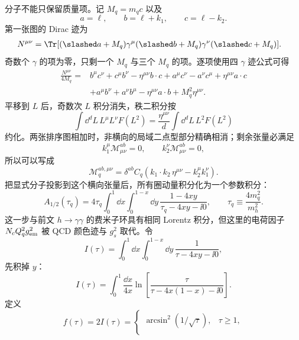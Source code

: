 \begin{derivation}
分子不能只保留质量项。记 $M_q=m_qc$ 以及
\begin{equation*}
a=\ell,\qquad b=\ell+k_1,\qquad c=\ell-k_2.
\end{equation*}
第一张图的 Dirac 迹为
\begin{align*}
N^{\mu\nu}
&=\Tr[(\slashed a+M_q)\gamma^\mu
(\slashed b+M_q)\gamma^\nu(\slashed c+M_q)].
\end{align*}
奇数个 $\gamma$ 的项为零，只剩一个 $M_q$ 与三个 $M_q$ 的项。逐项使用四 $\gamma$ 迹公式可得
\begin{align*}
\frac{N^{\mu\nu}}{4M_q}
={}&b^\mu c^\nu+c^\mu b^\nu-\eta^{\mu\nu}b\!\cdot c
+a^\mu c^\nu-a^\nu c^\mu+\eta^{\mu\nu}a\!\cdot c\\
&+a^\mu b^\nu+a^\nu b^\mu-\eta^{\mu\nu}a\!\cdot b
+M_q^2\eta^{\mu\nu}.
\end{align*}
平移到 $L$ 后，奇数次 $L$ 积分消失，秩二积分按
\begin{equation*}
\int\dd^dL\,L^\mu L^\nu F(L^2)
=\frac{\eta^{\mu\nu}}{d}\int\dd^dL\,L^2F(L^2)
\end{equation*}
约化。两张排序图相加时，非横向的局域二点型部分精确相消；剩余张量必满足
\begin{equation*}
k_1^\mu\mathcal M_{\mu\nu}^{ab}=0,
\qquad
k_2^\nu\mathcal M_{\mu\nu}^{ab}=0,
\end{equation*}
所以可以写成
\begin{equation*}
\mathcal M_{q}^{ab,\mu\nu}
=\delta^{ab}C_q
\left(k_1\!\cdot k_2\,\eta^{\mu\nu}-k_2^\mu k_1^\nu\right).
\end{equation*}
把显式分子投影到这个横向张量后，所有圈动量积分化为一个参数积分：
\begin{equation*}
A_{1/2}(\tau_q)
=4\tau_q\int_0^1\dd x\int_0^{1-x}\dd y\,
\frac{1-4xy}{\tau_q-4xy-\ii0},
\qquad
\tau_q\equiv\frac{4m_q^2}{m_h^2}.
\end{equation*}
这一步与前文 $h\to\gamma\gamma$ 的费米子环具有相同 Lorentz 积分，但这里的电荷因子 $N_cQ_q^2g_{\rm em}^2$ 被 QCD 颜色迹与 $g_s^2$ 取代。令
\begin{equation*}
I(\tau)=\int_0^1\dd x\int_0^{1-x}\dd y\,
\frac1{\tau-4xy-\ii0},
\end{equation*}
先积掉 $y$：
\begin{equation*}
I(\tau)=\int_0^1\frac{\dd x}{4x}
\ln\!\left[\frac{\tau}{\tau-4x(1-x)-\ii0}\right].
\end{equation*}
定义
\begin{equation*}
f(\tau)=2I(\tau)
=\begin{cases}
\arcsin^2(1/\sqrt\tau),&\tau\ge1,\\[4pt]

\end{cases}
\end{equation*}
\end{derivation}
